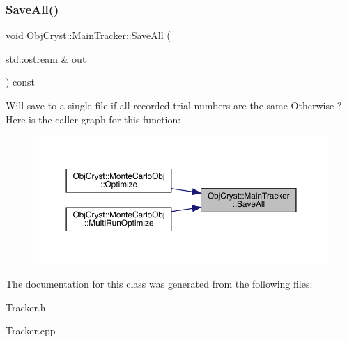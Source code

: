\subsubsection{\texorpdfstring{SaveAll()}{SaveAll()}}
{\footnotesize\ttfamily void Obj\+Cryst\+::\+Main\+Tracker\+::\+Save\+All (\begin{DoxyParamCaption}\item[{std\+::ostream \&}]{out }\end{DoxyParamCaption}) const}

Will save to a single file if all recorded trial numbers are the same Otherwise ? Here is the caller graph for this function\+:
\nopagebreak
\begin{figure}[H]
\begin{center}
\leavevmode
\includegraphics[width=350pt]{class_obj_cryst_1_1_main_tracker_a1bbb24cd3ff9eb57aca89f8b2c64b68b_icgraph}
\end{center}
\end{figure}


The documentation for this class was generated from the following files\+:\begin{DoxyCompactItemize}
\item 
Tracker.\+h\item 
Tracker.\+cpp\end{DoxyCompactItemize}
